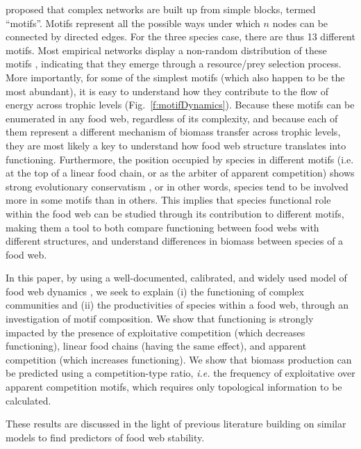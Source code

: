 \documentclass[12pt]{article}
\begin{document}
\textcite{Milo2002} proposed that complex networks are built up from simple
blocks, termed ``motifs''. Motifs represent all the possible ways under which
$n$ nodes can be connected by directed edges. For the three species case, there
are thus 13 different motifs. Most empirical networks display a non-random
distribution of these motifs \parencite{Bascompte2005,Stouffer2007}, indicating
that they emerge through a resource/prey selection process. More importantly,
for some of the simplest motifs (which also happen to be the most abundant), it
is easy to understand how they contribute to the flow of energy across trophic
levels (Fig.~\ref{f:motifDynamics}). Because these motifs can be enumerated in
any food web, regardless of its complexity, and because each of them represent a
different mechanism of biomass transfer across trophic levels, they are most
likely a key to understand how food web structure translates into functioning.
Furthermore, the position occupied by species in different motifs (i.e. at the
top of a linear food chain, or as the arbiter of apparent competition) shows
strong evolutionary conservatism \parencite{Stouffer2012}, or in other words,
species tend to be involved more in some motifs than in others. This implies
that species functional role within the food web can be studied through its
contribution to different motifs, making them a tool to both compare functioning
between food webs with different structures, and understand differences in
biomass between species of a food web.

In this paper, by using a well-documented, calibrated, and widely used model of
food web dynamics \parencite{Brose2006a}, we seek to explain (i) the functioning
of complex communities and (ii) the productivities of species within a food web,
through an investigation of motif composition. We show that functioning is
strongly impacted by the presence of exploitative competition (which decreases
functioning), linear food chains (having the same effect), and apparent
competition (which increases functioning). We show that biomass production can
be predicted using a competition-type ratio, \emph{i.e.} the frequency of
exploitative over apparent competition motifs, which requires only topological
information to be calculated.

These results are discussed in the light of previous literature building on
similar models to find predictors of food web stability.
\end{document}
